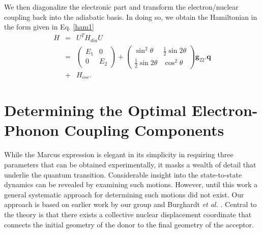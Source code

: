We then diagonalize the electronic part and transform the electron/nuclear coupling
back into the adiabatic basis.  In doing so,  we obtain the Hamiltonian in the
form given in Eq. \ref{ham1}
\begin{eqnarray}
H&=&U^{T}H_{dia}U\nonumber  \\
&=&\left(\begin{array}{cc}
E_{1}  & 0 \\
0 & E_{2}
\end{array}\right)+\left(\begin{array}{cc}
\sin^{2}\theta & \frac{1}{2}\sin2\theta\\
\frac{1}{2}\sin2\theta & \cos^{2}\theta
\end{array}\right) {\mathbf g}_{22}.{\mathbf q} \nonumber \\
&+& H_{osc}.\label{eq:locaiHam}
\end{eqnarray}







\section{Determining the Optimal Electron-Phonon Coupling Components}

While the Marcus expression is elegant in its simplicity in requiring three parameters that
can be obtained experimentally, it masks a wealth of detail that underlie the quantum transition. Considerable insight into the state-to-state dynamics can be revealed by examining such motions. However, until this work a general systematic approach for determining such motions did not exist. Our approach is based on earlier work by our group \cite{pereverzev2009energy} and Burghardt {\em et al.} \cite{gindensperger2006shortI,gindensperger2006shortII,cederbaum2005short}.
 Central to the theory is that there exists a collective nuclear displacement coordinate
that connects the initial geometry of the donor to the final geometry of the acceptor.

